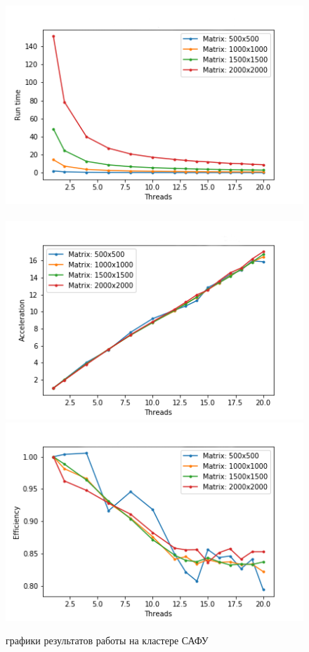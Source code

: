 \documentclass[12pt]{article}
\begin{document}
	\begin{figure}
		\centering
		\includegraphics[scale=0.4]{cluster/RuntimeCluster.png}~
		\includegraphics[scale=0.4]{cluster/AccelerationCluster.png}
		\includegraphics[scale=0.4]{cluster/EfficiencyCluster.png}
		\caption{графики результатов работы на кластере САФУ}
		

\end{figure}
\end{document}
